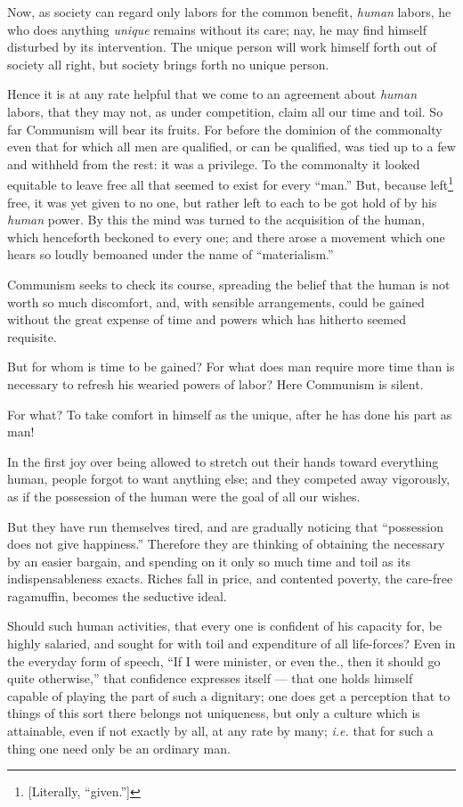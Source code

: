 Now, as society can regard only labors for the common benefit, \textit{human} 
labors, he who does anything \textit{unique} remains without its care; nay, he 
may find himself disturbed by its intervention. The unique person will work 
himself forth out of society all right, but society brings forth no unique 
person.

Hence it is at any rate helpful that we come to an agreement about 
\textit{human} labors, that they may not, as under competition, claim all our 
time and toil. So far Communism will bear its fruits. For before the dominion 
of the commonalty even that for which all men are qualified, or can be 
qualified, was tied up to a few and withheld from the rest: it was a 
privilege. To the commonalty it looked equitable to leave free all that seemed 
to exist for every ``man.'' But, because left\footnote{[Literally, 
``given.'']} free, it was yet given to no one, but rather left to each to be 
got hold of by his \textit{human} power. By this the mind was turned to the 
acquisition of the human, which henceforth beckoned to every one; and there 
arose a movement which one hears so loudly bemoaned under the name of 
``materialism.''

Communism seeks to check its course, spreading the belief that the human is 
not worth so much discomfort, and, with sensible arrangements, could be gained 
without the great expense of time and powers which has hitherto seemed 
requisite.

But for whom is time to be gained? For what does man require more time than is 
necessary to refresh his wearied powers of labor? Here Communism is silent.

For what? To take comfort in himself as the unique, after he has done his part 
as man!

In the first joy over being allowed to stretch out their hands toward 
everything human, people forgot to want anything else; and they competed away 
vigorously, as if the possession of the human were the goal of all our wishes.

But they have run themselves tired, and are gradually noticing that 
``possession does not give happiness.'' Therefore they are thinking of 
obtaining the necessary by an easier bargain, and spending on it only so much 
time and toil as its indispensableness exacts. Riches fall in price, and 
contented poverty, the care-free ragamuffin, becomes the seductive ideal.

Should such human activities, that every one is confident of his capacity for, 
be highly salaried, and sought for with toil and expenditure of all 
life-forces? Even in the everyday form of speech, ``If I were minister, or 
even the., then it should go quite otherwise,'' that confidence expresses 
itself --- that one holds himself capable of playing the part of such a 
dignitary; one does get a perception that to things of this sort there belongs 
not uniqueness, but only a culture which is attainable, even if not exactly by 
all, at any rate by many; \textit{i.e.} that for such a thing one need only be 
an ordinary man.

